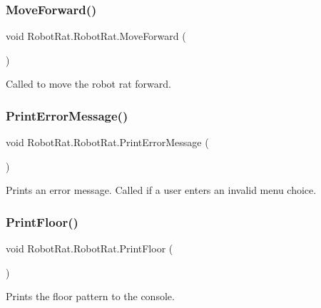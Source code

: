 \subsubsection{\texorpdfstring{Move\+Forward()}{MoveForward()}}
{\footnotesize\ttfamily void Robot\+Rat.\+Robot\+Rat.\+Move\+Forward (\begin{DoxyParamCaption}{ }\end{DoxyParamCaption})}



Called to move the robot rat forward. 

\mbox{\label{class_robot_rat_1_1_robot_rat_af8940f3489ad809f6114586f7f0bf175}} 
\subsubsection{\texorpdfstring{Print\+Error\+Message()}{PrintErrorMessage()}}
{\footnotesize\ttfamily void Robot\+Rat.\+Robot\+Rat.\+Print\+Error\+Message (\begin{DoxyParamCaption}{ }\end{DoxyParamCaption})}



Prints an error message. Called if a user enters an invalid menu choice. 

\mbox{\label{class_robot_rat_1_1_robot_rat_ae4f305c798227eb610474740577ad39a}} 
\subsubsection{\texorpdfstring{Print\+Floor()}{PrintFloor()}}
{\footnotesize\ttfamily void Robot\+Rat.\+Robot\+Rat.\+Print\+Floor (\begin{DoxyParamCaption}{ }\end{DoxyParamCaption})}



Prints the floor pattern to the console. 

\mbox{\label{class_robot_rat_1_1_robot_rat_af9553868271779ff859b038a735d5736}} 
